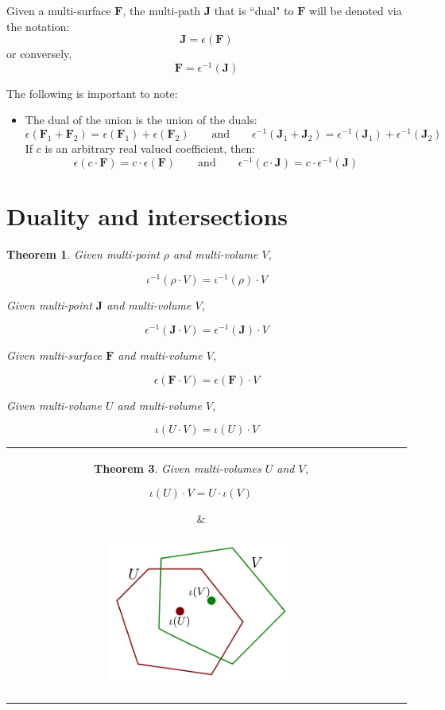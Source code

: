 \documentclass{book}
\newtheorem{thm}{Theorem}
\begin{document}
Given a multi-surface \(\mathbf{F}\), the multi-path \(\mathbf{J}\) that is ``dual" to \(\mathbf{F}\) will be denoted via the notation:
\[\mathbf{J} = \epsilon(\mathbf{F})\]
or conversely, 
\[\mathbf{F} = \epsilon^{-1}(\mathbf{J})\]

The following is important to note:
\begin{itemize}
\item The dual of the union is the union of the duals:
\[\epsilon(\mathbf{F}_1 + \mathbf{F}_2) = \epsilon(\mathbf{F}_1) + \epsilon(\mathbf{F}_2)
\quad\quad\text{and}\quad\quad
\epsilon^{-1}(\mathbf{J}_1 + \mathbf{J}_2) = \epsilon^{-1}(\mathbf{J}_1) + \epsilon^{-1}(\mathbf{J}_2)\]
If \(c\) is an arbitrary real valued coefficient, then:
\[\epsilon(c \cdot \mathbf{F}) = c \cdot \epsilon(\mathbf{F})
\quad\quad\text{and}\quad\quad
\epsilon^{-1}(c \cdot \mathbf{J}) = c \cdot \epsilon^{-1}(\mathbf{J})\]
\end{itemize}



\section{Duality and intersections}

\begin{thm}
Given multi-point \(\rho\) and multi-volume \(V\), 

\[\iota^{-1}(\rho \cdot V) = \iota^{-1}(\rho) \cdot V\]

Given multi-point \(\mathbf{J}\) and multi-volume \(V\), 

\[\epsilon^{-1}(\mathbf{J} \cdot V) = \epsilon^{-1}(\mathbf{J}) \cdot V\]

Given multi-surface \(\mathbf{F}\) and multi-volume \(V\), 

\[\epsilon(\mathbf{F} \cdot V) = \epsilon(\mathbf{F}) \cdot V\]

Given multi-volume \(U\) and multi-volume \(V\), 

\[\iota(U \cdot V) = \iota(U) \cdot V\]
\end{thm}


\begin{tabular}{cc}
\parbox{0.5\textwidth}{
\begin{thm}
Given multi-volumes \(U\) and \(V\),

\[\iota(U) \cdot V = U \cdot \iota(V)\]
\end{thm}
} & \parbox{0.5\textwidth}{
\includegraphics[width = 0.5\textwidth]{Duality/point_volume_duality_intersection}
}
\end{tabular}
\end{document}
